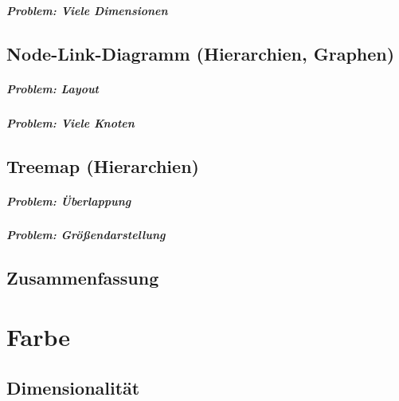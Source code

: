 \documentclass[a4paper, 11pt, accentcolor = tud3b]{tudreport}
\begin{document}
			\paragraph{Problem: Viele Dimensionen} %

		\section{Node-Link-Diagramm (Hierarchien, Graphen)} %

			\paragraph{Problem: Layout} %

			\paragraph{Problem: Viele Knoten} %

		\section{Treemap (Hierarchien)} %

			\paragraph{Problem: Überlappung} %

			\paragraph{Problem: Größendarstellung} %

		\section{Zusammenfassung} %

	\chapter{Farbe} %

		\section{Dimensionalität} %
\end{document}

